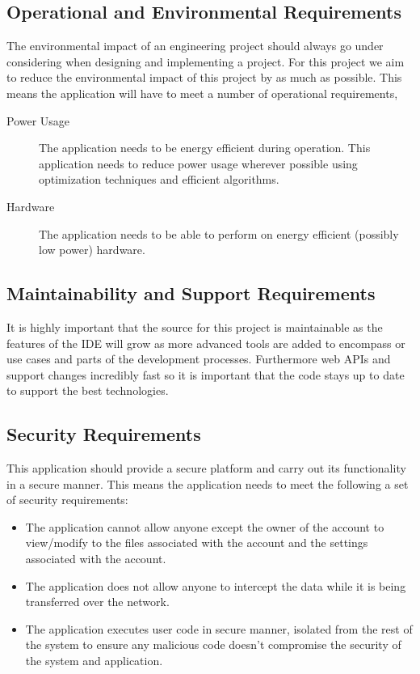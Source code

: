 \documentclass[12pt, titlepage]{article}
\begin{document}
  \subsection{Operational and Environmental Requirements}
	The environmental impact of an engineering project should always go under
	considering when designing and implementing a project. For this project we
	aim to reduce the environmental impact of this project by as much as
	possible. This means the application will have to meet a number of
	operational requirements,
  \begin{description}
		\item [Power Usage] The application needs to be energy efficient during
			operation. This application needs to reduce power usage wherever possible
			using optimization techniques and efficient algorithms.
		\item [Hardware] The application needs to be able to perform on energy
			efficient (possibly low power) hardware.
  \end{description}

  \subsection{Maintainability and Support Requirements}
	It is highly important that the source for this project is maintainable as
	the features of the IDE will grow as more advanced tools are added to
	encompass or use cases and parts of the development processes. Furthermore
	web APIs and support changes incredibly fast so it is important that the code
	stays up to date to support the best technologies.

  \subsection{Security Requirements}
  This application should provide a secure platform and carry out its
  functionality in a secure manner. This means the application needs to meet
  the following a set of security requirements:
  \begin{itemize}
    \item The application cannot allow anyone except the owner of the account
      to view/modify to the files associated with the account and the settings
      associated with the account.
    \item The application does not allow anyone to intercept the data while it
      is being transferred over the network.
    \item The application executes user code in secure manner, isolated from
      the rest of the system to ensure any malicious code doesn't compromise
      the security of the system and application.
  \end{itemize}
\end{document}
